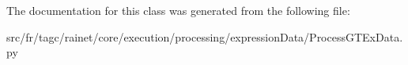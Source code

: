 The documentation for this class was generated from the following file\-:\begin{DoxyCompactItemize}
\item 
src/fr/tagc/rainet/core/execution/processing/expression\-Data/Process\-G\-T\-Ex\-Data.\-py\end{DoxyCompactItemize}

